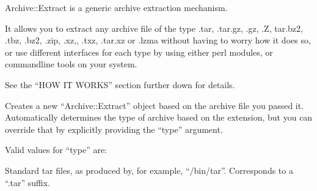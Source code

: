 \documentclass[]{article}
\begin{document}

Archive::Extract is a generic archive extraction mechanism.

It allows you to extract any archive file of the type .tar, .tar.gz,
.gz, .Z, tar.bz2, .tbz, .bz2, .zip, .xz,, .txz, .tar.xz or .lzma without
having to worry how it does so, or use different interfaces for each
type by using either perl modules, or commandline tools on your system.

See the ``HOW IT WORKS'' section further down for details.



Creates a new ``Archive::Extract'' object based on the archive file you
passed it. Automatically determines the type of archive based on the
extension, but you can override that by explicitly providing the
``type'' argument.

Valid values for ``type'' are:

\begin{description}
\itemsep1pt\parskip0pt
\item[tar]
Standard tar files, as produced by, for example, ``/bin/tar''.
Corresponds to a ``.tar'' suffix.
\end{description}
\end{document}
